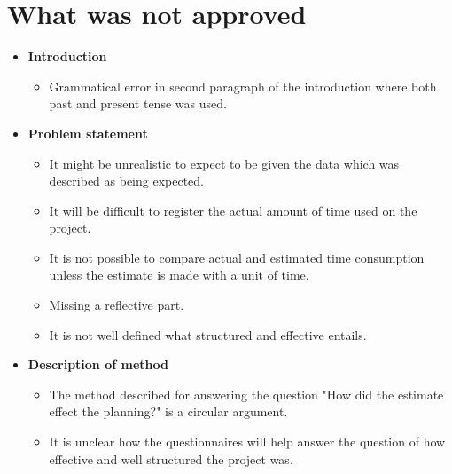 \documentclass[]{article}
\begin{document}
\section*{What was not approved}
\begin{itemize}
\item \textbf{Introduction}
	\begin{itemize}
	\item Grammatical error in second paragraph of the introduction where both past and present tense was used.
	\end{itemize}

\item \textbf{Problem statement}
	\begin{itemize}
	\item It might be unrealistic to expect to be given the data which was described as being expected.
	\item It will be difficult to register the actual amount of time used on the project.
	\item It is not possible to compare actual and estimated time consumption unless the estimate is made with a unit of time.
	\item Missing a reflective part.
	\item It is not well defined what structured and effective entails.
	\end{itemize}
\item \textbf{Description of method}
	\begin{itemize}
	\item The method described for answering the question "How did the estimate effect the planning?" is a circular argument.
	\item It is unclear how the questionnaires will help answer the question of how effective and well structured the project was.
	\end{itemize}
\end{itemize}
\end{document}
